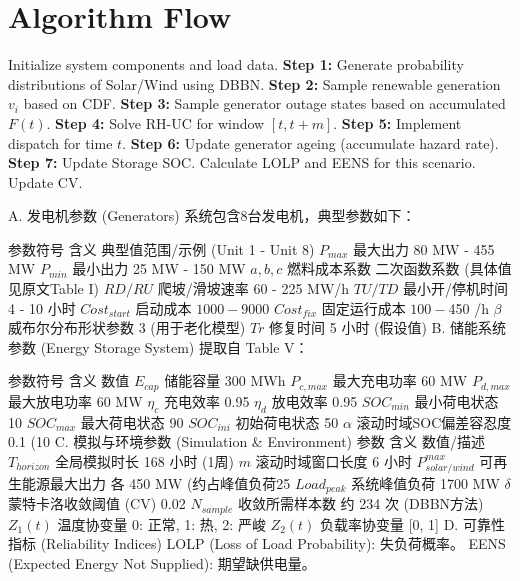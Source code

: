 \documentclass{article}
\begin{document}
\section{Algorithm Flow}
\begin{algorithmic}[1]
\State Initialize system components and load data.
    \State \textbf{Step 1:} Generate probability distributions of Solar/Wind using DBBN.
        \State \textbf{Step 2:} Sample renewable generation $v_i$ based on CDF.
        \State \textbf{Step 3:} Sample generator outage states based on accumulated $F(t)$.
        \State \textbf{Step 4:} Solve RH-UC for window $[t, t+m]$.
        \State \textbf{Step 5:} Implement dispatch for time $t$.
        \State \textbf{Step 6:} Update generator ageing (accumulate hazard rate).
        \State \textbf{Step 7:} Update Storage SOC.
    \EndFor
    \State Calculate LOLP and EENS for this scenario.
    \State Update CV.
\EndWhile
\end{algorithmic}


A. 发电机参数 (Generators)
系统包含8台发电机，典型参数如下：

参数符号	含义	典型值范围/示例 (Unit 1 - Unit 8)
$P_{max}$	最大出力	80 MW - 455 MW
$P_{min}$	最小出力	25 MW - 150 MW
$a, b, c$	燃料成本系数	二次函数系数 (具体值见原文Table I)
$RD/RU$	爬坡/滑坡速率	60 - 225 MW/h
$TU/TD$	最小开/停机时间	4 - 10 小时
$Cost_{start}$	启动成本	$1000 - $9000
$Cost_{fix}$	固定运行成本	$100 - $450 /h
$\beta$	威布尔分布形状参数	3 (用于老化模型)
$Tr$	修复时间	5 小时 (假设值)
B. 储能系统参数 (Energy Storage System)
提取自 Table V：

参数符号	含义	数值
$E_{cap}$	储能容量	300 MWh
$P_{c,max}$	最大充电功率	60 MW
$P_{d,max}$	最大放电功率	60 MW
$\eta_c$	充电效率	0.95
$\eta_d$	放电效率	0.95
$SOC_{min}$	最小荷电状态	10%
$SOC_{max}$	最大荷电状态	90%
$SOC_{ini}$	初始荷电状态	50%
$\alpha$	滚动时域SOC偏差容忍度	0.1 (10%
C. 模拟与环境参数 (Simulation & Environment)
参数	含义	数值/描述
$T_{horizon}$	全局模拟时长	168 小时 (1周)
$m$	滚动时域窗口长度	6 小时
$P_{solar/wind}^{max}$	可再生能源最大出力	各 450 MW (约占峰值负荷25%
$Load_{peak}$	系统峰值负荷	1700 MW
$\delta$	蒙特卡洛收敛阈值 (CV)	0.02
$N_{sample}$	收敛所需样本数	约 234 次 (DBBN方法)
$Z_1(t)$	温度协变量	{0: 正常, 1: 热, 2: 严峻}
$Z_2(t)$	负载率协变量	[0, 1]
D. 可靠性指标 (Reliability Indices)
LOLP (Loss of Load Probability): 失负荷概率。
EENS (Expected Energy Not Supplied): 期望缺供电量。
\end{document}

